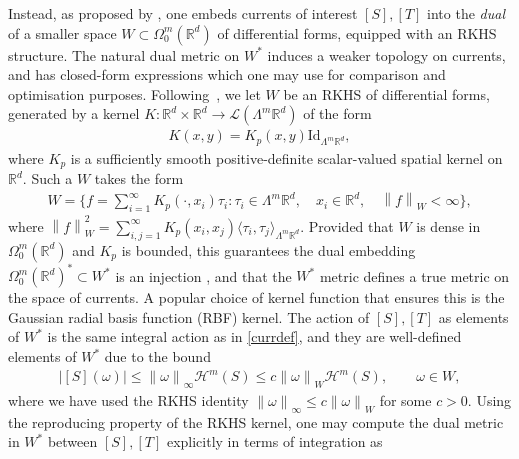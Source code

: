 \documentclass[sn-mathphys-num]{sn-jnl}%
\theoremstyle{thmstyleone}%
\theoremstyle{thmstyletwo}%
\theoremstyle{thmstylethree}%
\numberwithin{remark}{section}
\numberwithin{definition}{section}
\numberwithin{equation}{section}
\numberwithin{theorem}{section}
\newcommand{\norm}[1]{\left\lVert#1\right\rVert}
\newcommand{\R}{\ensuremath{\mathbb{R}}}%
\begin{document}

Instead, as proposed by \cite{GlaunesCurrents}, one embeds currents of interest $[S], [T]$ into the \textit{dual} of a smaller space $W \subset \Omega_{0}^{m}(\R^{d})$ of differential forms, equipped with an RKHS structure. The natural dual metric on $W^{*}$ induces a weaker topology on currents, and has closed-form expressions which one may use for comparison and optimisation purposes. Following~\cite{GlaunesCurrents}, we let $W$ be an RKHS of differential forms, generated by a kernel $K\colon \R^{d} \times \R^{d} \to \mathcal{L}(\Lambda^{m}\R^{d})$ of the form
\begin{align*}
    K(x,y) = K_{p}(x,y)\mathrm{Id}_{\Lambda^{m}\R^{d}},
\end{align*}
where $K_{p}$ is a sufficiently smooth positive-definite scalar-valued spatial kernel on $\R^{d}$. Such a $W$ takes the form
\begin{align*}
    W = \bigg\{f= \sum_{i=1}^{\infty}{K_{p}(\cdot,x_{i})\tau_{i} } \colon\tau_{i} \in \Lambda^{m}\R^{d} ,\quad x_{i} \in \R^{d},\quad \norm{f}_{W}<\infty\bigg\},
\end{align*}
where $\norm{f}_{W}^{2}=\sum_{i,j=1}^{\infty}{K_{p}(x_{i},x_{j})\langle \tau_{i},\tau_{j}\rangle_{\Lambda^{m}\R^{d}} }$.
Provided that $W$ is dense in $\Omega_{0}^{m}(\R^{d})$ and $K_p$ is bounded, this guarantees the dual embedding $\Omega_{0}^{m}(\R^{d})^{*} \subset W^{*}$ is an injection \cite{NCThesis}, and that the $W^{*}$ metric defines a true metric on the space of currents. A popular choice of kernel function that ensures this is the Gaussian radial basis function (RBF) kernel. The action of $[S],[T]$ as elements of $W^{*}$ is the same integral action as in \cref{currdef}, and they are well-defined elements of $W^{*}$ due to the bound
\begin{align*}
    \lvert [S](\omega)\rvert \leq \norm{\omega}_{\infty}\mathcal{H}^{m}(S) \leq c\norm{\omega}_{W}\mathcal{H}^{m}(S),\qquad \omega \in W,
\end{align*}
where we have used the RKHS identity $\norm{\omega}_{\infty} \leq c \norm{\omega}_{W}$ for some $c>0$. Using the reproducing property of the RKHS kernel, one may compute \cite{GlaunesCurrents} the dual metric in $W^{*}$ between $[S],[T]$ explicitly in terms of integration as
\end{document}
